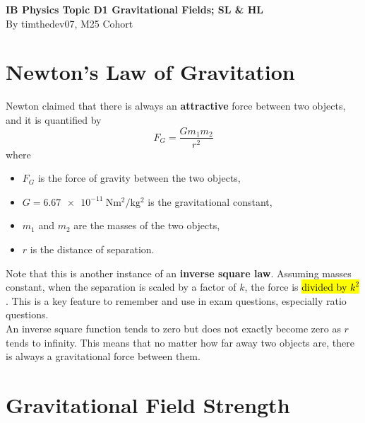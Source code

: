 \documentclass[a4paper,12pt]{article}
\let\oldsection\section
\renewcommand\section{\clearpage\oldsection}
\newcommand{\lb}{\\[8pt]}
\begin{document}
\pagestyle{fancy}


\begin{titlepage}
  \begin{center}

    \vspace*{8cm}
    \textbf{\Large {IB Physics Topic D1 Gravitational Fields; SL \& HL}} \\
    \vspace*{1cm}
    \large{By timthedev07, M25 Cohort}


  \end{center}
\end{titlepage}

\pagebreak
\tableofcontents
\pagebreak

\clearpage
\setcounter{page}{1}

\section{Newton's Law of Gravitation}

Newton claimed that there is always an \textbf{attractive} force between two objects, and it is quantified by
\begin{equation}\label{eq:newton}
  F_G = \frac{Gm_1m_2}{r^2}
\end{equation}
where
\begin{itemize}
  \item $F_G$ is the force of gravity between the two objects,
  \item $G = \SI{6.67e-11}{\newton\meter\squared\per\kilo\g\squared}$ is the gravitational constant,
  \item $m_1$ and $m_2$ are the masses of the two objects,
  \item $r$ is the distance of separation.
\end{itemize}

Note that this is another instance of an \textbf{inverse square law}. Assuming masses constant, when the separation is scaled by a factor of $k$, the force is \hl{divided by $k^2$}. This is a key feature to remember and use in exam questions, especially ratio questions.\lb
An inverse square function tends to zero but does not exactly become zero as $r$ tends to infinity. This means that no matter how far away two objects are, there is always a gravitational force between them.

\section{Gravitational Field Strength}
\end{document}
